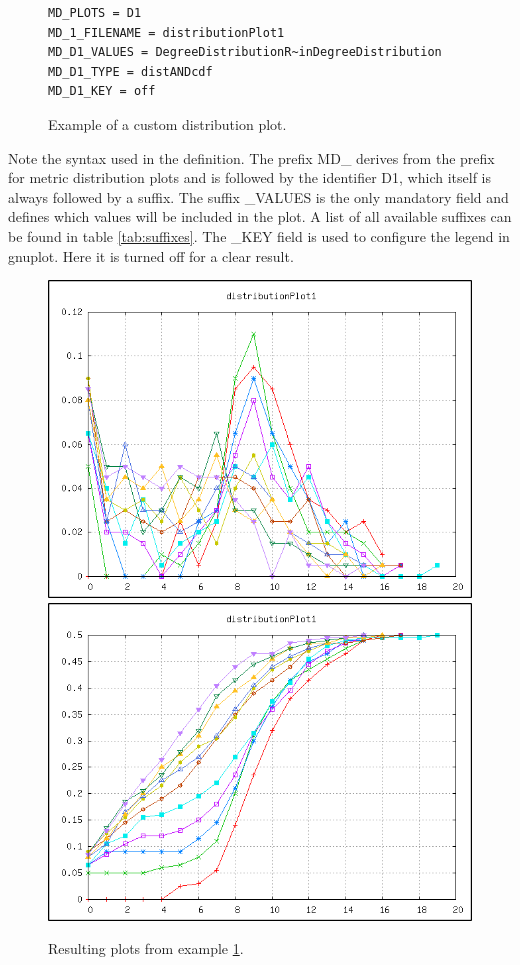\begin{figure}
\begin{lstlisting}
MD_PLOTS = D1
MD_1_FILENAME = distributionPlot1
MD_D1_VALUES = DegreeDistributionR~inDegreeDistribution
MD_D1_TYPE = distANDcdf
MD_D1_KEY = off
\end{lstlisting}
\caption{Example of a custom distribution plot.}
\label{ex:1}
\end{figure}

Note the syntax used in the definition. The prefix MD{\_} derives from the prefix for metric distribution plots and is followed by the identifier D1, which itself is always followed by a suffix. The suffix {\_}VALUES is the only mandatory field and defines which values will be included in the plot. A list of all available suffixes can be found in table \ref{tab:suffixes}. The {\_}KEY field is used to configure the legend in gnuplot. Here it is turned off for a clear result.

\begin{figure} [h]
\centering
\includegraphics [scale=0.65] {images/dist}
\includegraphics [scale=0.65] {images/distCDF}
\caption{Resulting plots from example \ref{ex:1}.}
\label{fig:33}
\end{figure}


